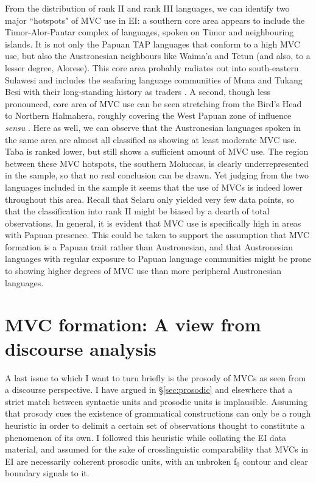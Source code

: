 From the distribution of rank II and rank III languages, we can identify two major ``hotspots" of MVC use in EI: a southern core area appears to include the Timor-Alor-Pantar complex of languages, spoken on Timor and neighbouring islands. It is not only the Papuan TAP languages that conform to a high MVC use, but also the Austronesian neighbours like Waima'a and Tetun (and also, to a lesser degree, Alorese). This core area probably radiates out into south-eastern Sulawesi and includes the seafaring language communities of Muna and Tukang Besi with their long-standing history as traders \citep{donohue1999}. A second, though less pronounced, core area of MVC use can be seen stretching from the Bird's Head to Northern Halmahera, roughly covering the West Papuan zone of influence \textit{sensu} \citet{reesink2005west}. Here as well, we can observe that the Austronesian languages spoken in the same area are almost all classified as showing at least moderate MVC use. Taba is ranked lower, but still shows a sufficient amount of MVC use. The region between these MVC hotspots, the southern Moluccas, is clearly underrepresented in the sample, so that no real conclusion can be drawn. Yet judging from the two languages included in the sample it seems that the use of MVCs is indeed lower throughout this area. Recall that Selaru only yielded very few data points, so that the classification into rank II might be biased by a dearth of total observations. In general, it is evident that MVC use is specifically high in areas with Papuan presence. This could be taken to support the assumption that MVC formation is a Papuan trait rather than Austronesian, and that Austronesian languages with regular exposure to Papuan language communities might be prone to showing higher degrees of MVC use than more peripheral Austronesian languages.

\section{MVC formation: A view from discourse analysis} \label{sec:discourse}

A last issue to which I want to turn briefly is the prosody of MVCs as seen from a discourse perspective. I have argued in §\ref{sec:prosodic} and elsewhere that a strict match between syntactic units and prosodic units is implausible. Assuming that prosody cues the existence of grammatical constructions can only be a rough heuristic in order to delimit a certain set of observations thought to constitute a phenomenon of its own. I followed this heuristic while collating the EI data material, and assumed for the sake of crosslinguistic comparability that MVCs in EI are necessarily coherent prosodic units, with an unbroken f$_0$ contour and clear boundary signals to it.

